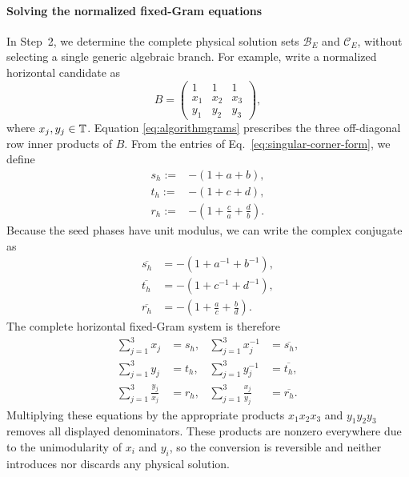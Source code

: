 \paragraph*{Solving the normalized fixed-Gram equations} In Step~2, we determine the complete physical solution sets $\mathcal B_E$ and $\mathcal C_E$, without selecting a single generic algebraic branch. For example, write a normalized horizontal candidate as 
\begin{equation} 
B= 
\begin{pmatrix} 
1&1&1\\ x_1&x_2&x_3\\ y_1&y_2&y_3 \end{pmatrix}, 
\label{eq:main-fixed-gram-coordinate-form} 
\end{equation} 
where $x_j,y_j\in\mathbb T$.
Equation \ref{eq:algorithmgrams} prescribes the three off-diagonal row inner products of $B$.
%
From the entries of Eq.~\ref{eq:singular-corner-form}, we define
\begin{equation}
\begin{split}
   s_h:=&-(1+a+b),\\
    t_h:=&-(1+c+d),\\
    r_h:=&-\left(1+\frac ca+\frac db\right). 
\end{split}
\label{eq:trace-data-main}
\end{equation}
Because the seed phases have unit modulus, we can write the complex conjugate as
\begin{equation}
\begin{aligned}
\overline{s_h}&=-(1+a^{-1}+b^{-1}),\\
\overline{t_h}&=-(1+c^{-1}+d^{-1}),\\
\overline{r_h}&=-\left(1+\frac ac+\frac bd\right).
\end{aligned}
\end{equation}
The complete horizontal fixed-Gram system is therefore
\begin{equation}
\begin{aligned}
\sum_{j=1}^3x_j&=s_h,
&\sum_{j=1}^3x_j^{-1}&=\overline{s_h},\\
\sum_{j=1}^3y_j&=t_h,
&\sum_{j=1}^3y_j^{-1}&=\overline{t_h},\\
\sum_{j=1}^3\frac{y_j}{x_j}&=r_h,
&\sum_{j=1}^3\frac{x_j}{y_j}&=\overline{r_h}.
\end{aligned}
\label{eq:main-fixed-gram-sums}
\end{equation}
Multiplying these equations by the appropriate products $x_1x_2x_3$ and $y_1y_2y_3$ removes all displayed denominators. These
products are nonzero everywhere due to the unimodularity of $x_{i}$ and $y_{i}$, so the conversion is reversible and neither introduces nor discards any physical solution.

